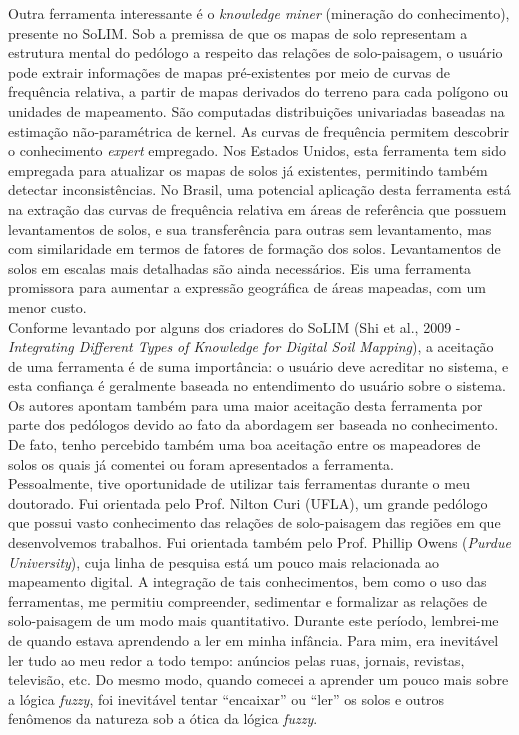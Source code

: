 Outra ferramenta interessante é o \emph{knowledge miner} (mineração do conhecimento), presente no SoLIM. Sob a premissa de que os mapas de solo representam a estrutura mental do pedólogo a respeito das relações de solo-paisagem, o usuário pode extrair informações de mapas pré-existentes por meio de curvas de frequência relativa, a partir de mapas derivados do terreno para cada polígono ou unidades de mapeamento. São computadas distribuições univariadas baseadas na estimação não-paramétrica de kernel. As curvas de frequência permitem descobrir o conhecimento \emph{expert} empregado. Nos Estados Unidos, esta ferramenta tem sido empregada para atualizar os mapas de solos já existentes, permitindo também detectar inconsistências. No Brasil, uma potencial aplicação desta ferramenta está na extração das curvas de frequência relativa em áreas de referência que possuem levantamentos de solos, e sua transferência para outras sem levantamento, mas com similaridade em termos de fatores de formação dos solos. 
Levantamentos de solos em escalas mais detalhadas são ainda necessários. Eis uma ferramenta promissora para aumentar a expressão geográfica de áreas mapeadas, com um menor custo.\\
Conforme levantado por alguns dos criadores do SoLIM (Shi et al., 2009 - \emph{Integrating Different Types of Knowledge for Digital Soil Mapping}), a aceitação de uma ferramenta é de suma importância: o usuário deve acreditar no sistema, e esta confiança é geralmente baseada no entendimento do usuário sobre o sistema. Os autores apontam também para uma maior aceitação desta ferramenta por parte dos pedólogos devido ao fato da abordagem ser baseada no conhecimento. De fato, tenho percebido também uma boa aceitação entre os mapeadores de solos os quais já comentei ou foram apresentados a ferramenta.\\
Pessoalmente, tive oportunidade de utilizar tais ferramentas durante o meu doutorado. Fui orientada pelo Prof. Nilton Curi (UFLA), um grande pedólogo que possui vasto conhecimento das relações de solo-paisagem das regiões em que desenvolvemos trabalhos. Fui orientada também pelo Prof. Phillip Owens (\emph{Purdue University}), cuja linha de pesquisa está um pouco mais relacionada ao mapeamento digital. A integração de tais conhecimentos, bem como o uso das ferramentas, me permitiu compreender, sedimentar e formalizar as relações de solo-paisagem de um modo mais quantitativo. Durante este período, lembrei-me de quando estava aprendendo a ler em minha infância. Para mim, era inevitável ler tudo ao meu redor a todo tempo: anúncios pelas ruas, jornais, revistas, televisão, etc. Do mesmo modo, quando comecei a aprender um pouco mais sobre a lógica \emph{fuzzy}, foi inevitável tentar ``encaixar'' ou ``ler'' os solos e outros fenômenos da natureza sob a ótica da lógica \emph{fuzzy}.\\
